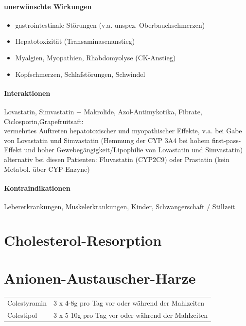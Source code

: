 \documentclass[10pt,a4paper]{report}
\begin{document}
\paragraph{unerwünschte Wirkungen} %
\label{par:unerw_nschte_wirkungen}
\begin{itemize}
	\item  gastrointestinale Störungen (v.a. unspez. Oberbauchschmerzen)
	\item Hepatotoxizität (Transaminasenanstieg)
	\item Myalgien, Myopathien, Rhabdomyolyse (CK-Anstieg)
	\item Kopfschmerzen, Schlafstörungen, Schwindel
\end{itemize}
\paragraph{Interaktionen} %
\label{par:interaktionen}
Lovastatin, Simvastatin + Makrolide, Azol-Antimykotika, Fibrate, Ciclosporin,Grapefruitsaft:\\ 
vermehrtes Auftreten hepatotoxischer und myopathischer Effekte, v.a. bei Gabe von Lovastatin und Simvastatin (Hemmung der CYP 3A4 bei hohem first-pass-Effekt und hoher Gewebegängigkeit/Lipophilie von Lovastatin und Simvastatin)\\
alternativ bei diesen Patienten: 	Fluvastatin (CYP2C9) oder Prastatin (kein Metabol. über CYP-Enzyne)
\paragraph{Kontraindikationen} %
\label{par:kontraindikationen}
Lebererkrankungen, Muskelerkrankungen, Kinder, Schwangerschaft / Stillzeit	
\section{Cholesterol-Resorption} %
\label{sec:cholesterol_resorption}

\section{Anionen-Austauscher-Harze} %
\label{sec:anionen_austauscher_harze}
\begin{tabularx}{\textwidth}{XX}
Colestyramin&3 x 4-8g pro Tag vor oder während der Mahlzeiten\\
Colestipol&3 x 5-10g pro Tag vor oder während der Mahlzeiten\\
\end{tabularx}
\end{document}
